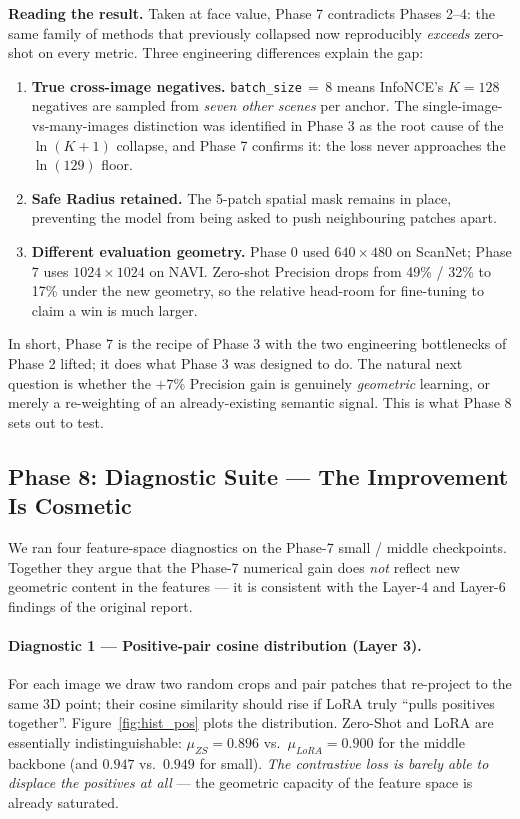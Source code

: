 \documentclass[11pt,a4paper]{article}
\begin{document}
\textbf{Reading the result.}
Taken at face value, Phase 7 contradicts Phases 2--4: the same family of methods that previously collapsed now reproducibly \emph{exceeds} zero-shot on every metric. Three engineering differences explain the gap:
\begin{enumerate}
    \item \textbf{True cross-image negatives.} \texttt{batch\_size}\,$=$\,8 means InfoNCE's $K{=}128$ negatives are sampled from \emph{seven other scenes} per anchor. The single-image-vs-many-images distinction was identified in Phase 3 as the root cause of the $\ln(K{+}1)$ collapse, and Phase 7 confirms it: the loss never approaches the $\ln(129)$ floor.
    \item \textbf{Safe Radius retained.} The 5-patch spatial mask remains in place, preventing the model from being asked to push neighbouring patches apart.
    \item \textbf{Different evaluation geometry.} Phase 0 used $640\times480$ on ScanNet; Phase 7 uses $1024\times1024$ on NAVI. Zero-shot Precision drops from 49\% / 32\% to 17\% under the new geometry, so the relative head-room for fine-tuning to claim a win is much larger.
\end{enumerate}

In short, Phase 7 is the recipe of Phase 3 with the two engineering bottlenecks of Phase 2 lifted; it does what Phase 3 was designed to do. The natural next question is whether the $+7\%$ Precision gain is genuinely \emph{geometric} learning, or merely a re-weighting of an already-existing semantic signal. This is what Phase 8 sets out to test.

\subsection{Phase 8: Diagnostic Suite --- The Improvement Is Cosmetic}
\label{sec:phase8}

We ran four feature-space diagnostics on the Phase-7 small / middle checkpoints. Together they argue that the Phase-7 numerical gain does \emph{not} reflect new geometric content in the features --- it is consistent with the Layer-4 and Layer-6 findings of the original report.

\paragraph{Diagnostic 1 --- Positive-pair cosine distribution (Layer 3).}
For each image we draw two random crops and pair patches that re-project to the same 3D point; their cosine similarity should rise if LoRA truly ``pulls positives together''. Figure~\ref{fig:hist_pos} plots the distribution. Zero-Shot and LoRA are essentially indistinguishable: $\mu_{ZS}=0.896$ vs.\ $\mu_{LoRA}=0.900$ for the middle backbone (and $0.947$ vs.\ $0.949$ for small). \emph{The contrastive loss is barely able to displace the positives at all} --- the geometric capacity of the feature space is already saturated.
\end{document}
